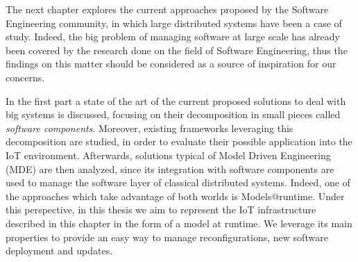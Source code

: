 The next chapter explores the current approaches proposed by the Software Engineering community, in which large distributed systems have been a case of study.
Indeed, the big problem of managing software at large scale has already been covered by the research done on the field of Software Engineering, thus the findings on this matter should be considered as a source of inspiration for our concerns.

In the first part a state of the art of the current proposed solutions to deal with big systems is discussed, focusing on their decomposition in small pieces called \textit{software components}.
Moreover, existing frameworks leveraging this decomposition are studied, in order to evaluate their possible application into the IoT environment.
Afterwards, solutions typical of Model Driven Engineering (MDE) are then analyzed, since its integration with software components are used to manage the software layer of classical distributed systems.
Indeed, one of the approaches which take advantage of both worlds is Models@runtime\cite{morin2009mar}.
Under this perspective, in this thesis we aim to represent the IoT infrastructure described in this chapter in the form of a model at runtime.
We leverage its main properties to provide an easy way to manage reconfigurations, new software deployment and updates.





